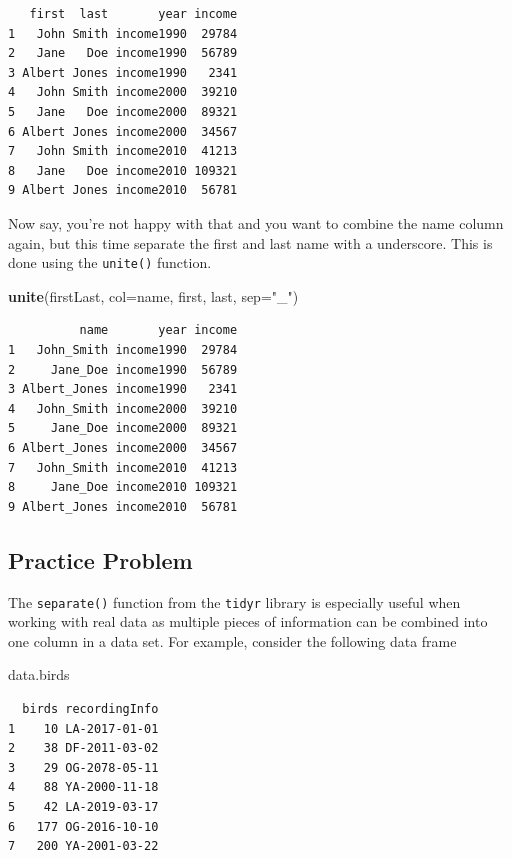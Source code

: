 \documentclass[
]{krantz}
\makeatletter
\newenvironment{Shaded}{\begin{snugshade}}{\end{snugshade}}
\newcommand{\DataTypeTok}[1]{\textcolor[rgb]{0.27,0.27,0.27}{#1}}
\newcommand{\KeywordTok}[1]{\textcolor[rgb]{0.27,0.27,0.27}{\textbf{#1}}}
\newcommand{\NormalTok}[1]{#1}
\newcommand{\StringTok}[1]{\textcolor[rgb]{0.5,0.5,0.5}{#1}}
\newenvironment{kframe}{%
\medskip{}
\setlength{\fboxsep}{.8em}
 \def\at@end@of@kframe{}%
 \ifinner\ifhmode%
  \def\at@end@of@kframe{\end{minipage}}%
  \begin{minipage}{\columnwidth}%
 \fi\fi%
 \def\FrameCommand##1{\hskip\@totalleftmargin \hskip-\fboxsep
 \colorbox{shadecolor}{##1}\hskip-\fboxsep
     \hskip-\linewidth \hskip-\@totalleftmargin \hskip\columnwidth}%
 \MakeFramed {\advance\hsize-\width
   \@totalleftmargin\z@ \linewidth\hsize
   \@setminipage}}%
 {\par\unskip\endMakeFramed%
 \at@end@of@kframe}
\renewenvironment{Shaded}{\begin{kframe}}{\end{kframe}}
\makeatother
\begin{document}
\begin{verbatim}
   first  last       year income
1   John Smith income1990  29784
2   Jane   Doe income1990  56789
3 Albert Jones income1990   2341
4   John Smith income2000  39210
5   Jane   Doe income2000  89321
6 Albert Jones income2000  34567
7   John Smith income2010  41213
8   Jane   Doe income2010 109321
9 Albert Jones income2010  56781
\end{verbatim}

Now say, you're not happy with that and you want to combine the name column again, but this time separate the first and last name with a underscore. This is done using the \texttt{unite()} function.

\begin{Shaded}
\begin{Highlighting}[]
\KeywordTok{unite}\NormalTok{(firstLast, }\DataTypeTok{col=}\NormalTok{name, first, last, }\DataTypeTok{sep=}\StringTok{"\_"}\NormalTok{)}
\end{Highlighting}
\end{Shaded}

\begin{verbatim}
          name       year income
1   John_Smith income1990  29784
2     Jane_Doe income1990  56789
3 Albert_Jones income1990   2341
4   John_Smith income2000  39210
5     Jane_Doe income2000  89321
6 Albert_Jones income2000  34567
7   John_Smith income2010  41213
8     Jane_Doe income2010 109321
9 Albert_Jones income2010  56781
\end{verbatim}

\hypertarget{Ch6PP3}{%
\subsection{Practice Problem}\label{Ch6PP3}}

The \texttt{separate()} function from the \texttt{tidyr} library is especially useful when working with real data as multiple pieces of information can be combined into one column in a data set. For example, consider the following data frame

\begin{Shaded}
\begin{Highlighting}[]
\NormalTok{data.birds}
\end{Highlighting}
\end{Shaded}

\begin{verbatim}
  birds recordingInfo
1    10 LA-2017-01-01
2    38 DF-2011-03-02
3    29 OG-2078-05-11
4    88 YA-2000-11-18
5    42 LA-2019-03-17
6   177 OG-2016-10-10
7   200 YA-2001-03-22
\end{verbatim}
\end{document}
